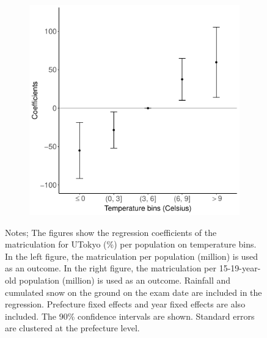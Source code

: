 \documentclass[10pt, pdfmx,hiresbb]{beamer}
\begin{document}
\begin{frame}
\begin{figure}
\begin{minipage}{0.44\textwidth}
\begin{figure}[h]
        \includegraphics[width = \textwidth]{../Output/images/per_pop_reg_4.pdf}
        \centering
      \end{figure}
    \end{minipage}
    \tiny
    \begin{tablenotes}
    \item Notes;
      The figures show the regression coefficients of the matriculation for UTokyo (\%) per population on temperature bins.
      In the left figure, the matriculation per population (million) is used as an outcome.
      In the right figure, the matriculation per 15-19-year-old population (million) is used as an outcome.
      Rainfall and cumulated snow on the ground on the exam date are included in the regression.
      Prefecture fixed effects and year fixed effects are also included.
      The 90\% confidence intervals are shown.
      Standard errors are clustered at the prefecture level.
    \end{tablenotes}
  \end{figure}
\end{frame}
\end{document}
